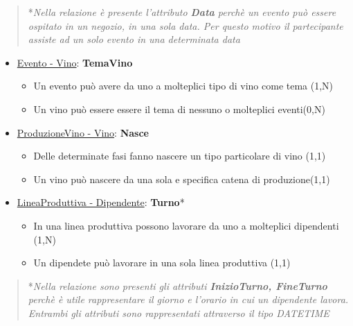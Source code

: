 \begin{verse}
	*\emph{Nella relazione è presente l'attributo \textbf{Data} perchè un evento può essere ospitato in un negozio, in una sola data. Per questo motivo il partecipante assiste ad un solo evento in una determinata data}
\end{verse}

\begin{itemize}
	\item \underline{Evento - Vino}: \textbf{TemaVino}
	
	\begin{itemize}
		\item Un evento può avere da uno a molteplici tipo di vino come tema (1,N)
		\item Un vino può essere essere il tema di nessuno o molteplici eventi(0,N)
	\end{itemize}
	
\end{itemize}

\begin{itemize}
	\item \underline{ProduzioneVino - Vino}: \textbf{Nasce}
	
	\begin{itemize}
		\item Delle determinate fasi fanno nascere un tipo particolare di vino (1,1)
		\item Un vino può nascere da una sola e specifica catena di produzione(1,1)
	\end{itemize}
	
\end{itemize}

\begin{itemize}
	\item \underline{LineaProduttiva - Dipendente}: \textbf{Turno}*
	
	\begin{itemize}
		\item In una linea produttiva possono lavorare da uno a molteplici dipendenti (1,N)
		\item Un dipendete può lavorare in una sola linea produttiva (1,1)
	\end{itemize}
	
\end{itemize}

\begin{verse}
	*\emph{Nella relazione sono presenti gli attributi \textbf{InizioTurno, FineTurno} perchè è utile rappresentare il giorno e l'orario in cui un dipendente lavora. Entrambi gli attributi sono rappresentati attraverso il tipo DATETIME}
\end{verse}

